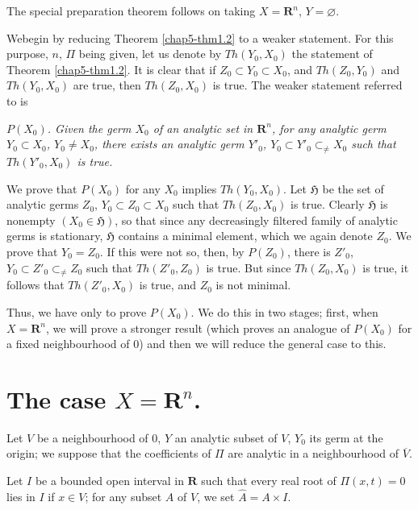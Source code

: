 The special preparation theorem follows on taking $X = \mathbf{R}^n$, $Y=\varnothing$.

We\pageoriginale begin by reducing Theorem \ref{chap5-thm1.2} to a weaker statement. For this purpose, $n$, $\Pi$ being given, let us denote by $Th (Y_0, X_0)$ the statement of Theorem \ref{chap5-thm1.2}. It is clear that if $Z_0 \subset Y_0 \subset X_0$, and $Th (Z_0, Y_0)$ and $Th(Y_0, X_0)$ are true, then $Th(Z_0, X_0)$ is true. The weaker statement referred to is

\textit{$P(X_0)$. Given the germ $X_0$ of an analytic set in $\mathbf{R}^n$, for any analytic germ $Y_0 \subset X_0$, $Y_0 \neq X_0$, there exists an analytic germ $Y'_0$, $Y_0 \subset Y'_0 {\displaystyle\mathop{\subset}_\neq} X_0$ such that $Th (Y'_0, X_0)$ is true.}

We prove that $P(X_0)$ for any $X_0$ implies $Th (Y_0, X_0)$. Let $\mathfrak{H}$ be the set of analytic germs $Z_0$, $Y_0 \subset Z_0 \subset X_0$ such that $Th (Z_0,X_0)$ is true. Clearly $\mathfrak{H}$ is nonempty $(X_0 \in \mathfrak{H})$, so that since any decreasingly filtered family of analytic germs is stationary, $\mathfrak{H}$ contains a minimal element, which we again denote $Z_0$. We prove that $Y_0 = Z_0$. If this were not so, then, by $P(Z_0)$, there is $Z'_0$, $Y_0 \subset Z'_0 {\displaystyle\mathop{\subset}_\neq} Z_0$ such that $Th (Z'_0, Z_0)$ is true. But since $Th (Z_0, X_0)$ is true, it follows that $Th(Z'_0, X_0)$ is true, and $Z_0$ is not minimal.

Thus, we have only to prove $P(X_0)$. We do this in two stages; first, when $X = \mathbf{R}^n$, we will prove a stronger result (which proves an analogue of $P(X_0)$ for a fixed neighbourhood of 0) and then we will reduce the general case to this.

\vspace{-.2cm}

\section[The case $X = \mathbf{R}^n$]{The case \boldmath$X = \mathbf{R}^n$.}\label{chap5-sec2}

Let $V$ be a neighbourhood of $0$, $Y$ an analytic subset of $V$, $Y_0$ its germ at the origin; we suppose that the coefficients of $\Pi$ are analytic in a neighbourhood of $\overline{V}$.


Let $I$ be a bounded open interval in $\mathbf{R}$ such that every real root of $\Pi(x,t)=0$ lies in $I$ if $x \in V$; for any subset $A$ of $V$, we set $\widehat{A} = A \times I$.

